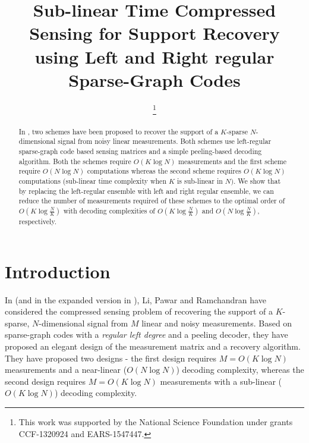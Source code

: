 \documentclass[conference]{IEEEtran}
\begin{document}
\IEEEoverridecommandlockouts


\title{\LARGE{Sub-linear Time Compressed Sensing for Support Recovery using Left and Right regular Sparse-Graph Codes}}
\author{

\thanks{This work was supported by the National Science Foundation under grants CCF-1320924 and EARS-1547447.}
}

\maketitle
\begin{abstract}
In \cite{li2015subisit,li2015subdraft}, two schemes have been proposed to recover the support of a $K$-sparse $N$-dimensional signal from noisy linear measurements. Both schemes use left-regular sparse-graph code based sensing matrices and a simple peeling-based decoding algorithm. Both the schemes require $O(K \log N)$ measurements and the first scheme require $O(N \log N)$ computations whereas the second scheme requires $O(K \log N)$ computations (sub-linear time complexity when $K$ is sub-linear in $N)$. We show that by replacing the left-regular ensemble with left and right regular ensemble, we can reduce the number of measurements required of these schemes to the optimal order of $O\left(K \log \frac{N}{K} \right)$ with decoding complexities of $O(K \log \frac{N}{K})$ and $O(N \log \frac{N}{K})$, respectively.
\end{abstract}
\pagestyle{empty}

\section{Introduction}
In \cite{li2015subisit} (and in the expanded version in \cite{li2015subdraft}), Li, Pawar and Ramchandran have considered the compressed sensing problem of recovering the support of a $K$-sparse, $N$-dimensional signal from $M$ linear and noisy measurements. Based on sparse-graph codes with a \emph{regular left degree} and a peeling decoder, they have proposed an elegant design of the measurement matrix and a recovery algorithm. %
They have proposed two designs - the first design requires $M = O(K \log N)$ measurements and a near-linear ($O(N \log N)$) decoding complexity, whereas the second design requires $M = O(K \log N)$ measurements with a sub-linear ($O(K \log N)$) decoding complexity.
\end{document}

